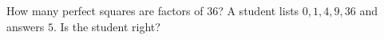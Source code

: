 How many perfect squares are factors of $36$? A student lists $0,1,4,9,36$ and answers $5$. Is the student right?
